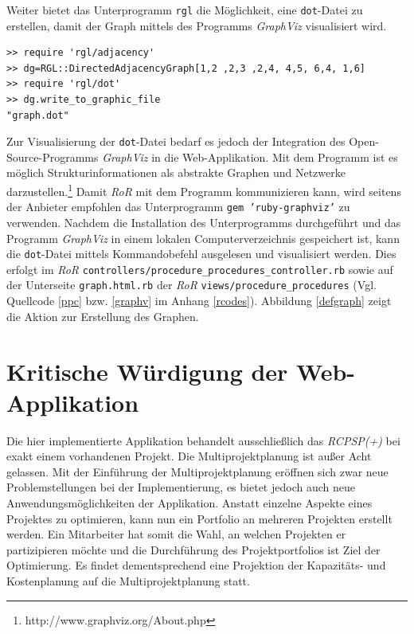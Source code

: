 \documentclass[a4paper,12pt,parskip,bibtotoc,liststotoc]{article}
\begin{document}
Weiter bietet das Unterprogramm \texttt{rgl} die Möglichkeit, eine \texttt{dot}-Datei zu erstellen, damit der Graph mittels des Programms \textit{GraphViz} visualisiert wird.
\newpage


\begin{lstlisting}[caption=Prüfung auf Zyklen mittels des Unterprogramms \glqq rgl\grqq, style=Listing, label=rgl-vonseite]
>> require 'rgl/adjacency'
>> dg=RGL::DirectedAdjacencyGraph[1,2 ,2,3 ,2,4, 4,5, 6,4, 1,6]
>> require 'rgl/dot'
>> dg.write_to_graphic_file
"graph.dot"
\end{lstlisting}

Zur Visualisierung der \texttt{dot}-Datei bedarf es jedoch der Integration des Open-Source-Pro\-gramms \textit{GraphViz} in die Web-Applikation. Mit dem Programm ist es möglich Strukturinformationen als abstrakte Graphen und Netzwerke darzustellen.\footnote{http://www.graphviz.org/About.php} Damit \textit{RoR} mit dem Programm kommunizieren kann, wird seitens der Anbieter empfohlen das Unterprogramm \texttt{gem 'ruby-graphviz'} zu verwenden. Nachdem die Installation des Unterprogramms durchgeführt und das Programm \textit{GraphViz} in einem lokalen Computerverzeichnis gespeichert ist, kann die \texttt{dot}-Datei mittels Kommandobefehl ausgelesen und visualisiert werden. Dies erfolgt im \textit{RoR} \texttt{controllers/procedure\_procedures\_controller.rb} sowie auf der Unterseite \texttt{graph.html.rb} der \textit{RoR} \texttt{views/procedure\_procedures} (Vgl. Quellcode \ref{ppc} bzw. \ref{graphv} im Anhang \ref{rcodes}). Abbildung \ref{defgraph} zeigt die Aktion zur Erstellung des Graphen.




\section{Kritische Würdigung der Web-Applikation} \label{krit}
Die hier implementierte Applikation behandelt ausschließlich das \textit{RCPSP(+)} bei exakt einem vorhandenen Projekt. Die Multiprojektplanung ist außer Acht gelassen. Mit der Einführung der Multiprojektplanung eröffnen sich zwar neue Problemstellungen bei der Implementierung, es bietet jedoch auch neue Anwendungsmöglichkeiten der Applikation. Anstatt einzelne Aspekte eines Projektes zu optimieren, kann nun ein Portfolio an mehreren Projekten erstellt werden. Ein Mitarbeiter hat somit die Wahl, an welchen Projekten er partizipieren möchte und die Durchführung des Projektportfolios ist Ziel der Optimierung. Es findet dementsprechend eine Projektion der Kapazitäts- und Kostenplanung auf die Multiprojektplanung statt.\\
\end{document}

